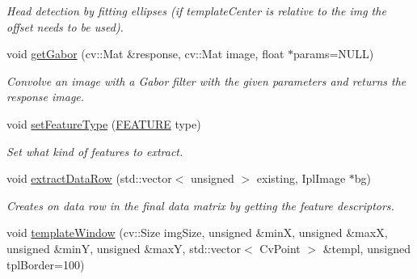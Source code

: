 \begin{DoxyCompactItemize}
\begin{DoxyCompactList}\small\item\em Head detection by fitting ellipses (if  templateCenter is relative to the  img the offset needs to be used). \item\end{DoxyCompactList}\item 
void \hyperlink{classfeatureDetector_a6123a7e06d28a9fcd294485c9ac19384}{getGabor} (cv::Mat \&response, cv::Mat image, float $\ast$params=NULL)
\begin{DoxyCompactList}\small\item\em Convolve an image with a  Gabor filter with the given parameters and returns the  response image. \item\end{DoxyCompactList}\item 
\hypertarget{classfeatureDetector_abd0f089ff65b2aa9163b0c6635eb5222}{
void \hyperlink{classfeatureDetector_abd0f089ff65b2aa9163b0c6635eb5222}{setFeatureType} (\hyperlink{classfeatureDetector_a84a8847c4124b284d1d5ae20bc9be583}{FEATURE} type)}
\label{classfeatureDetector_abd0f089ff65b2aa9163b0c6635eb5222}

\begin{DoxyCompactList}\small\item\em Set what kind of features to extract. \item\end{DoxyCompactList}\item 
\hypertarget{classfeatureDetector_aae498845bcbfe3df527b0503ba08122c}{
void \hyperlink{classfeatureDetector_aae498845bcbfe3df527b0503ba08122c}{extractDataRow} (std::vector$<$ unsigned $>$ existing, IplImage $\ast$bg)}
\label{classfeatureDetector_aae498845bcbfe3df527b0503ba08122c}

\begin{DoxyCompactList}\small\item\em Creates on data row in the final data matrix by getting the feature descriptors. \item\end{DoxyCompactList}\item 
\hypertarget{classfeatureDetector_a011ff09a0b8681af02bc4a633ee3b480}{
void \hyperlink{classfeatureDetector_a011ff09a0b8681af02bc4a633ee3b480}{templateWindow} (cv::Size imgSize, unsigned \&minX, unsigned \&maxX, unsigned \&minY, unsigned \&maxY, std::vector$<$ CvPoint $>$ \&templ, unsigned tplBorder=100)}
\label{classfeatureDetector_a011ff09a0b8681af02bc4a633ee3b480}


\end{DoxyCompactItemize}
